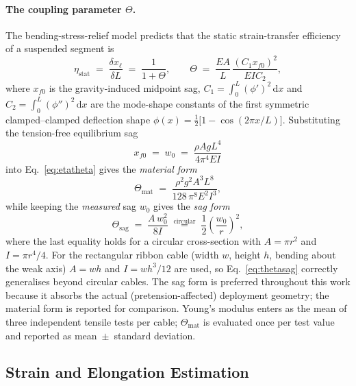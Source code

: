 \paragraph{The coupling parameter $\Theta$.}
\label{sec:proc:geometry:theta}
The bending-stress-relief model \citep{ProbstSimone} predicts that the
static strain-transfer efficiency of a suspended segment is
\begin{equation}
  \eta_\mathrm{stat} \;=\; \frac{\delta x_\ell}{\delta L}
                    \;=\; \frac{1}{1+\Theta},
  \qquad
  \Theta \;=\; \frac{EA}{L}\,\frac{(C_1 x_{f0})^2}{E I C_2},
  \label{eq:etatheta}
\end{equation}
where $x_{f0}$ is the gravity-induced midpoint sag,
$C_1 = \int_0^L (\phi')^2\,\mathrm{d}x$ and
$C_2 = \int_0^L (\phi'')^2\,\mathrm{d}x$ are the mode-shape constants of the
first symmetric clamped--clamped deflection shape
$\phi(x) = \tfrac{1}{2}\bigl[1-\cos(2\pi x/L)\bigr]$. Substituting the
tension-free equilibrium sag
\begin{equation}
  x_{f0} \;=\; w_0 \;=\; \frac{\rho A g L^4}{4\pi^4 E I}
  \label{eq:sagtheory}
\end{equation}
into Eq.~\eqref{eq:etatheta} gives the \emph{material form}
\begin{equation}
  \Theta_\mathrm{mat} \;=\; \frac{\rho^2 g^2 A^3 L^8}{128\,\pi^8 E^2 I^3},
  \label{eq:thetamaterial}
\end{equation}
while keeping the \emph{measured} sag $w_0$ gives the \emph{sag form}
\begin{equation}
  \Theta_\mathrm{sag} \;=\; \frac{A\, w_0^2}{8 I}
  \;\overset{\text{circular}}{=}\; \frac{1}{2}\left(\frac{w_0}{r}\right)^2 ,
  \label{eq:thetasag}
\end{equation}
where the last equality holds for a circular cross-section with
$A = \pi r^2$ and $I = \pi r^4/4$. For the rectangular ribbon cable
(width $w$, height $h$, bending about the weak axis) $A = wh$ and
$I = w h^3/12$ are used, so Eq.~\eqref{eq:thetasag} correctly generalises
beyond circular cables. The sag form is preferred throughout this work
because it absorbs the actual (pretension-affected) deployment geometry; the
material form is reported for comparison. Young's modulus enters as the mean
of three independent tensile tests per cable; $\Theta_\mathrm{mat}$ is
evaluated once per test value and reported as mean~$\pm$~standard deviation.

\subsection{Strain and Elongation Estimation}
\label{sec:proc:strain}

